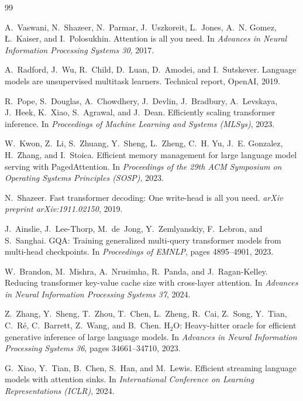 \documentclass[11pt]{article}
\begin{document}
\begin{thebibliography}{99}
\footnotesize

A.~Vaswani, N.~Shazeer, N.~Parmar, J.~Uszkoreit, L.~Jones, A.~N. Gomez, {\L}.~Kaiser, and I.~Polosukhin.
\newblock Attention is all you need.
\newblock In \emph{Advances in Neural Information Processing Systems 30}, 2017.

A.~Radford, J.~Wu, R.~Child, D.~Luan, D.~Amodei, and I.~Sutskever.
\newblock Language models are unsupervised multitask learners.
\newblock Technical report, OpenAI, 2019.

R.~Pope, S.~Douglas, A.~Chowdhery, J.~Devlin, J.~Bradbury, A.~Levskaya, J.~Heek, K.~Xiao, S.~Agrawal, and J.~Dean.
\newblock Efficiently scaling transformer inference.
\newblock In \emph{Proceedings of Machine Learning and Systems (MLSys)}, 2023.

W.~Kwon, Z.~Li, S.~Zhuang, Y.~Sheng, L.~Zheng, C.~H. Yu, J.~E. Gonzalez, H.~Zhang, and I.~Stoica.
\newblock Efficient memory management for large language model serving with PagedAttention.
\newblock In \emph{Proceedings of the 29th ACM Symposium on Operating Systems Principles (SOSP)}, 2023.

N.~Shazeer.
\newblock Fast transformer decoding: One write-head is all you need.
\newblock \emph{arXiv preprint arXiv:1911.02150}, 2019.

J.~Ainslie, J.~Lee-Thorp, M.~de~Jong, Y.~Zemlyanskiy, F.~Lebron, and S.~Sanghai.
\newblock GQA: Training generalized multi-query transformer models from multi-head checkpoints.
\newblock In \emph{Proceedings of EMNLP}, pages 4895--4901, 2023.

W.~Brandon, M.~Mishra, A.~Nrusimha, R.~Panda, and J.~Ragan-Kelley.
\newblock Reducing transformer key-value cache size with cross-layer attention.
\newblock In \emph{Advances in Neural Information Processing Systems 37}, 2024.

Z.~Zhang, Y.~Sheng, T.~Zhou, T.~Chen, L.~Zheng, R.~Cai, Z.~Song, Y.~Tian, C.~R{\'e}, C.~Barrett, Z.~Wang, and B.~Chen.
\newblock H$_2$O: Heavy-hitter oracle for efficient generative inference of large language models.
\newblock In \emph{Advances in Neural Information Processing Systems 36}, pages 34661--34710, 2023.

G.~Xiao, Y.~Tian, B.~Chen, S.~Han, and M.~Lewis.
\newblock Efficient streaming language models with attention sinks.
\newblock In \emph{International Conference on Learning Representations (ICLR)}, 2024.


\end{thebibliography}
\end{document}
